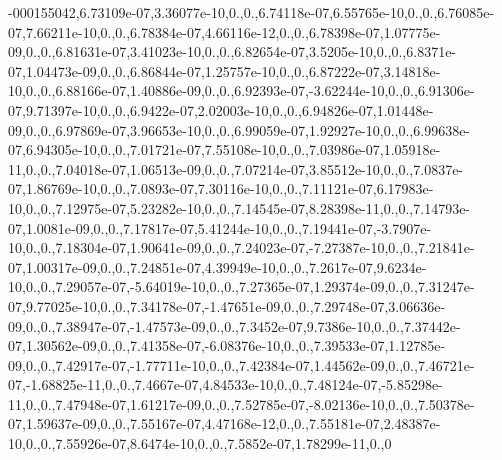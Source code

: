 \begin{DoxyCompactItemize}
-000155042,6.\-73109e-\/07,3.\-36077e-\/10,0.,0.,6.\-74118e-\/07,6.\-55765e-\/10,0.,0.,6.\-76085e-\/07,7.\-66211e-\/10,0.,0.,6.\-78384e-\/07,4.\-66116e-\/12,0.,0.,6.\-78398e-\/07,1.\-07775e-\/09,0.,0.,6.\-81631e-\/07,3.\-41023e-\/10,0.,0.,6.\-82654e-\/07,3.\-5205e-\/10,0.,0.,6.\-8371e-\/07,1.\-04473e-\/09,0.,0.,6.\-86844e-\/07,1.\-25757e-\/10,0.,0.,6.\-87222e-\/07,3.\-14818e-\/10,0.,0.,6.\-88166e-\/07,1.\-40886e-\/09,0.,0.,6.\-92393e-\/07,-\/3.\-62244e-\/10,0.,0.,6.\-91306e-\/07,9.\-71397e-\/10,0.,0.,6.\-9422e-\/07,2.\-02003e-\/10,0.,0.,6.\-94826e-\/07,1.\-01448e-\/09,0.,0.,6.\-97869e-\/07,3.\-96653e-\/10,0.,0.,6.\-99059e-\/07,1.\-92927e-\/10,0.,0.,6.\-99638e-\/07,6.\-94305e-\/10,0.,0.,7.\-01721e-\/07,7.\-55108e-\/10,0.,0.,7.\-03986e-\/07,1.\-05918e-\/11,0.,0.,7.\-04018e-\/07,1.\-06513e-\/09,0.,0.,7.\-07214e-\/07,3.\-85512e-\/10,0.,0.,7.\-0837e-\/07,1.\-86769e-\/10,0.,0.,7.\-0893e-\/07,7.\-30116e-\/10,0.,0.,7.\-11121e-\/07,6.\-17983e-\/10,0.,0.,7.\-12975e-\/07,5.\-23282e-\/10,0.,0.,7.\-14545e-\/07,8.\-28398e-\/11,0.,0.,7.\-14793e-\/07,1.\-0081e-\/09,0.,0.,7.\-17817e-\/07,5.\-41244e-\/10,0.,0.,7.\-19441e-\/07,-\/3.\-7907e-\/10,0.,0.,7.\-18304e-\/07,1.\-90641e-\/09,0.,0.,7.\-24023e-\/07,-\/7.\-27387e-\/10,0.,0.,7.\-21841e-\/07,1.\-00317e-\/09,0.,0.,7.\-24851e-\/07,4.\-39949e-\/10,0.,0.,7.\-2617e-\/07,9.\-6234e-\/10,0.,0.,7.\-29057e-\/07,-\/5.\-64019e-\/10,0.,0.,7.\-27365e-\/07,1.\-29374e-\/09,0.,0.,7.\-31247e-\/07,9.\-77025e-\/10,0.,0.,7.\-34178e-\/07,-\/1.\-47651e-\/09,0.,0.,7.\-29748e-\/07,3.\-06636e-\/09,0.,0.,7.\-38947e-\/07,-\/1.\-47573e-\/09,0.,0.,7.\-3452e-\/07,9.\-7386e-\/10,0.,0.,7.\-37442e-\/07,1.\-30562e-\/09,0.,0.,7.\-41358e-\/07,-\/6.\-08376e-\/10,0.,0.,7.\-39533e-\/07,1.\-12785e-\/09,0.,0.,7.\-42917e-\/07,-\/1.\-77711e-\/10,0.,0.,7.\-42384e-\/07,1.\-44562e-\/09,0.,0.,7.\-46721e-\/07,-\/1.\-68825e-\/11,0.,0.,7.\-4667e-\/07,4.\-84533e-\/10,0.,0.,7.\-48124e-\/07,-\/5.\-85298e-\/11,0.,0.,7.\-47948e-\/07,1.\-61217e-\/09,0.,0.,7.\-52785e-\/07,-\/8.\-02136e-\/10,0.,0.,7.\-50378e-\/07,1.\-59637e-\/09,0.,0.,7.\-55167e-\/07,4.\-47168e-\/12,0.,0.,7.\-55181e-\/07,2.\-48387e-\/10,0.,0.,7.\-55926e-\/07,8.\-6474e-\/10,0.,0.,7.\-5852e-\/07,1.\-78299e-\/11,0.,0
\end{DoxyCompactItemize}
